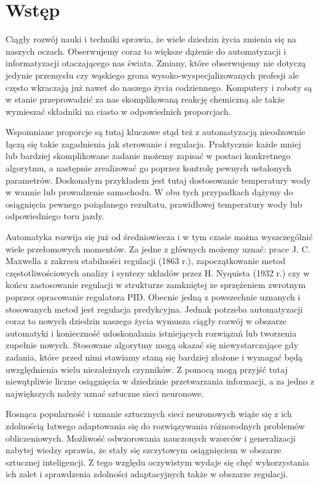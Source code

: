 \newpage %
\section{Wstęp}
\par Ciągły rozwój nauki i techniki sprawia, że wiele dziedzin życia zmienia się na naszych oczach. Obserwujemy coraz to większe dążenie do automatyzacji i informatyzacji otaczającego nas świata. Zmiany, które obserwujemy nie dotyczą jedynie przemysłu czy wąskiego grona wysoko-wyspecjalizowanych profesji ale często wkraczają już nawet do naszego życia codziennego. Komputery i roboty są  w stanie przeprowadzić za nas skomplikowaną reakcję chemiczną ale także wymieszać składniki na ciasto w odpowiednich proporcjach. 

\par Wspomniane proporcje są tutaj kluczowe stąd też z automatyzacją nieodzownie łączą się takie zagadnienia jak sterowanie i regulacja. Praktycznie każde mniej lub bardziej skomplikowane zadanie możemy zapisać w postaci konkretnego algorytmu, a następnie zrealizować go poprzez kontrolę pewnych ustalonych parametrów. Doskonałym przykładem jest tutaj dostosowanie temperatury wody w wannie lub prowadzenie samochodu. W obu tych przypadkach dążymy do osiągnięcia pewnego pożądanego rezultatu, prawidłowej temperatury wody lub odpowiedniego toru jazdy.

\par Automatyka rozwija się już od średniowiecza i w tym czasie można wyszczególnić wiele przełomowych momentów. Za jedne z głównych możemy uznać: prace J. C. Maxwella z zakresu stabilności regulacji (1863 r.), zapoczątkowanie metod częstotliwościowych analizy i syntezy układów przez H. Nyquista (1932 r.) czy w końcu zastosowanie regulacji w strukturze zamkniętej ze sprzężeniem zwrotnym poprzez opracowanie regulatora PID. Obecnie jedną z powszechnie uznanych i stosowanych metod jest regulacja predykcyjna. Jednak potrzeba automatyzacji coraz to nowych dziedzin naszego życia wymusza ciągły rozwój w obszarze automatyki i konieczność udoskonalania istniejących rozwiązań lub tworzenia zupełnie nowych. Stosowane algorytmy mogą okazać się niewystarczające gdy zadania, które przed nimi stawiamy staną się bardziej złożone i wymagać będą uwzględnienia wielu niezależnych czynników. Z pomocą mogą przyjść tutaj niewątpliwie liczne osiągnięcia w dziedzinie przetwarzania informacji, a za jedno z największych należy uznać sztuczne sieci neuronowe.

\par Rosnąca popularność i uznanie sztucznych sieci neuronowych wiąże się z ich zdolnością łatwego adaptowania się do rozwiązywania różnorodnych problemów obliczeniowych. Możliwość odwzorowania nauczonych wzorców i generalizacji nabytej wiedzy sprawia, że stały się szczytowym osiągnięciem w obszarze sztucznej inteligencji. Z tego względu oczywistym wydaje się chęć wykorzystania ich zalet i sprawdzenia zdolności adaptacyjnych także w obszarze regulacji.
  
